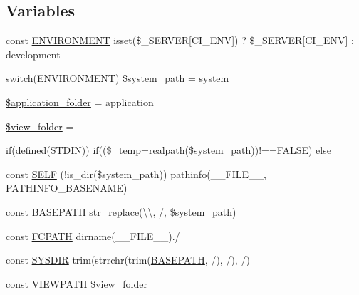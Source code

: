 \subsection*{Variables}
\begin{DoxyCompactItemize}
\item 
const \hyperlink{_admin_2index_8php_a8757a57d09df5349f8b93b2083e29a1e}{E\+N\+V\+I\+R\+O\+N\+M\+E\+N\+T} isset(\$\+\_\+\+S\+E\+R\+V\+E\+R\mbox{[}\textquotesingle{}C\+I\+\_\+\+E\+N\+V\textquotesingle{}\mbox{]}) ? \$\+\_\+\+S\+E\+R\+V\+E\+R\mbox{[}\textquotesingle{}C\+I\+\_\+\+E\+N\+V\textquotesingle{}\mbox{]} \+: \textquotesingle{}development\textquotesingle{}
\item 
switch(\hyperlink{_admin_2index_8php_a8757a57d09df5349f8b93b2083e29a1e}{E\+N\+V\+I\+R\+O\+N\+M\+E\+N\+T}) \hyperlink{_admin_2index_8php_af832b0c9a5014f0bb87496701ceb30e5}{\$system\+\_\+path} = \textquotesingle{}system\textquotesingle{}
\item 
\hyperlink{_admin_2index_8php_ace4309eda0b92e3260b226079bc17909}{\$application\+\_\+folder} = \textquotesingle{}application\textquotesingle{}
\item 
\hyperlink{_admin_2index_8php_a974fdae9fe36c7e07e82bb71ed42b6b3}{\$view\+\_\+folder} = \textquotesingle{}\textquotesingle{}
\item 
\hyperlink{_admin_2assets_2js_2bootstrap_8min_8js_a87cf461060832b8b68a7b48d9e371e4f}{if}(\hyperlink{_admin_2tests_2_bootstrap_8php_a46458e8654a714e0565e20f63021add9}{defined}(\textquotesingle{}S\+T\+D\+I\+N\textquotesingle{})) \hyperlink{_admin_2assets_2js_2bootstrap_8min_8js_a87cf461060832b8b68a7b48d9e371e4f}{if}((\$\+\_\+temp=realpath(\$system\+\_\+path))!==F\+A\+L\+S\+E) \hyperlink{_admin_2index_8php_afe05baa2384a370483088b4c250fcd90}{else}
\item 
const \hyperlink{_admin_2index_8php_a428c045e64680e1582ba74161e441a1c}{S\+E\+L\+F} (!is\+\_\+dir(\$system\+\_\+path)) pathinfo(\+\_\+\+\_\+\+F\+I\+L\+E\+\_\+\+\_\+, P\+A\+T\+H\+I\+N\+F\+O\+\_\+\+B\+A\+S\+E\+N\+A\+M\+E)
\item 
const \hyperlink{_admin_2index_8php_ad39801cabfd338dc5524466fe793fda9}{B\+A\+S\+E\+P\+A\+T\+H} str\+\_\+replace(\textquotesingle{}\textbackslash{}\textbackslash{}\textquotesingle{}, \textquotesingle{}/\textquotesingle{}, \$system\+\_\+path)
\item 
const \hyperlink{_admin_2index_8php_ae486546e58b2603595efedf9f95b3926}{F\+C\+P\+A\+T\+H} dirname(\+\_\+\+\_\+\+F\+I\+L\+E\+\_\+\+\_\+).\textquotesingle{}/\textquotesingle{}
\item 
const \hyperlink{_admin_2index_8php_ab645ae0961792b1f2b4b83f89cb95fa5}{S\+Y\+S\+D\+I\+R} trim(strrchr(trim(\hyperlink{_admin_2index_8php_ad39801cabfd338dc5524466fe793fda9}{B\+A\+S\+E\+P\+A\+T\+H}, \textquotesingle{}/\textquotesingle{}), \textquotesingle{}/\textquotesingle{}), \textquotesingle{}/\textquotesingle{})
\item 
const \hyperlink{_admin_2index_8php_ade8921d52af58583e5727833459224c3}{V\+I\+E\+W\+P\+A\+T\+H} \$view\+\_\+folder
\end{DoxyCompactItemize}


